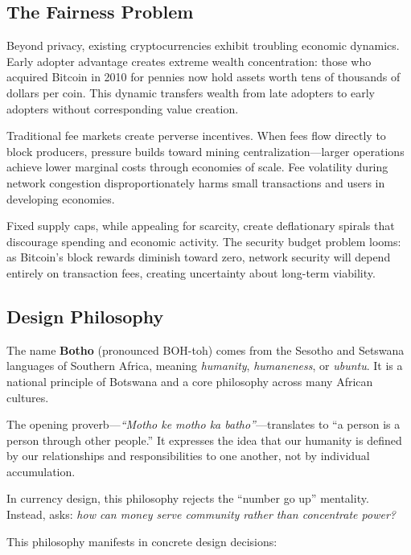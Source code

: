 \subsection{The Fairness Problem}

Beyond privacy, existing cryptocurrencies exhibit troubling economic
dynamics. Early adopter advantage creates extreme wealth concentration:
those who acquired Bitcoin in 2010 for pennies now hold assets worth
tens of thousands of dollars per coin. This dynamic transfers wealth
from late adopters to early adopters without corresponding value creation.

Traditional fee markets create perverse incentives. When fees flow directly
to block producers, pressure builds toward mining centralization---larger
operations achieve lower marginal costs through economies of scale. Fee
volatility during network congestion disproportionately harms small
transactions and users in developing economies.

Fixed supply caps, while appealing for scarcity, create deflationary
spirals that discourage spending and economic activity. The security
budget problem looms: as Bitcoin's block rewards diminish toward zero,
network security will depend entirely on transaction fees, creating
uncertainty about long-term viability.

\subsection{Design Philosophy}

The name \textbf{Botho} (pronounced BOH-toh) comes from the Sesotho and
Setswana languages of Southern Africa, meaning \textit{humanity},
\textit{humaneness}, or \textit{ubuntu}. It is a national principle of
Botswana and a core philosophy across many African cultures.

The opening proverb---\textit{``Motho ke motho ka batho''}---translates
to ``a person is a person through other people.'' It expresses the idea
that our humanity is defined by our relationships and responsibilities
to one another, not by individual accumulation.

In currency design, this philosophy rejects the ``number go up'' mentality.
Instead, \Botho asks: \textit{how can money serve community rather than
concentrate power?}

This philosophy manifests in concrete design decisions:

